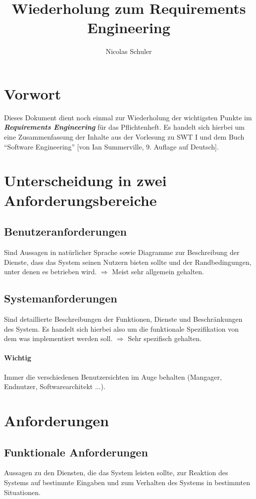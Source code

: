 \documentclass[parskip=full]{scrartcl}
\title{Wiederholung zum Requirements Engineering}
\author{Nicolas Schuler}
\begin{document}
\maketitle
\section{Vorwort}
Dieses Dokument dient noch einmal zur Wiederholung der wichtigsten Punkte im \textbf{\textit{Requirements Engineering}} für das Pflichtenheft.
Es handelt sich hierbei um eine Zusammenfassung der Inhalte aus der Vorlesung zu SWT I und dem Buch \enquote{Software Engineering} [von Ian Summerville, 9. Auflage auf Deutsch].

\section{Unterscheidung in zwei Anforderungsbereiche}
\subsection{Benutzeranforderungen}
Sind Aussagen in natürlicher Sprache sowie Diagramme zur Beschreibung der Dienste, dass das System seinen Nutzern bieten sollte und der Randbedingungen, unter denen es betrieben wird.
$\Rightarrow$ Meist sehr allgemein gehalten.

\subsection{Systemanforderungen}
Sind detaillierte Beschreibungen der Funktionen, Dienste und Beschränkungen des System. Es handelt sich hierbei also um die funktionale Spezifikation von dem was implementiert werden soll.
$\Rightarrow$ Sehr spezifisch gehalten.

\paragraph{Wichtig}
Immer die verschiedenen Benutzersichten im Auge behalten (Mangager, Endnutzer, Softwarearchitekt ...).

\section{Anforderungen}
\subsection{Funktionale Anforderungen}
Aussagen zu den Diensten, die das System leisten sollte, zur Reaktion des Systems auf bestimmte Eingaben und zum Verhalten des Systems in bestimmten Situationen.
\end{document}
